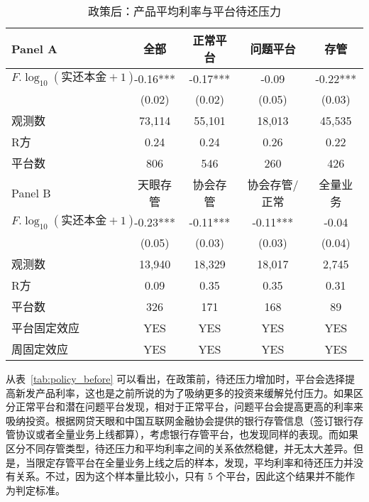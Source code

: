 \documentclass[lang=cn,11pt]{elegantpaper}
\begin{document}
\begin{table}[htbp]
  \centering
  \caption{政策后：产品平均利率与平台待还压力}
    \begin{tabular}{lcccc}
    \toprule
    Panel A & 全部    & 正常平台  & 问题平台  & 存管 \\
    \midrule
    $F.\log_{10}(\text{实还本金}+1)$ & -0.16*** & -0.17*** & -0.09 & -0.22*** \\
          & (0.02) & (0.02) & (0.05) & (0.03) \\
    观测数   & 73,114 & 55,101 & 18,013 & 45,535 \\
    R方    & 0.24  & 0.24  & 0.26  & 0.22 \\
    平台数   & 806   & 546   & 260   & 426 \\
    \midrule
    Panel B & 天眼存管  & 协会存管  & 协会存管/正常 & 全量业务 \\
    \midrule
    $F.\log_{10}(\text{实还本金}+1)$ & -0.23*** & -0.11*** & -0.11*** & -0.04 \\
          & (0.05) & (0.03) & (0.03) & (0.04) \\
    观测数   & 13,940 & 18,329 & 18,017 & 2,745 \\
    R方    & 0.09  & 0.35  & 0.35  & 0.31 \\
    平台数   & 326   & 171   & 168   & 89 \\
    平台固定效应 & YES   & YES   & YES   & YES \\
    周固定效应 & YES   & YES   & YES   & YES \\
    \bottomrule
    \end{tabular}%
  \label{tab:policy_after}%
\end{table}%


从表~\ref{tab:policy_before} 可以看出，在政策前，待还压力增加时，平台会选择提高新发产品利率，这也是之前所说的为了吸纳更多的投资来缓解兑付压力。如果区分正常平台和潜在问题平台发现，相对于正常平台，问题平台会提高更高的利率来吸纳投资。根据网贷天眼和中国互联网金融协会提供的银行存管信息（签订银行存管协议或者全量业务上线都算），考虑银行存管平台，也发现同样的表现。而如果区分不同存管类型，待还压力和平均利率之间的关系依然稳健，并无太大差异。但是，当限定存管平台在全量业务上线之后的样本，发现，平均利率和待还压力并没有关系。不过，因为这个样本量比较小，只有 5 个平台，因此这个结果并不能作为判定标准。
\end{document}
